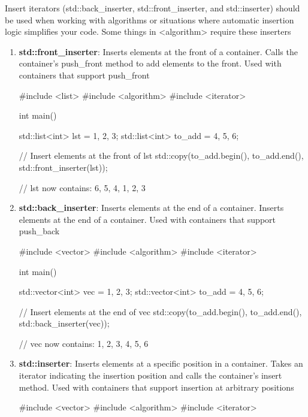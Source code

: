 \documentclass{report}
\begin{document}
\begin{itemize}
            Insert iterators (std::back\_inserter, std::front\_inserter, and std::inserter) should be used when working with algorithms or situations where automatic insertion logic simplifies your code.
            \bigbreak \noindent 
            Some things in <algorithm> require these inserters
            \begin{enumerate}
                \item \textbf{std::front\_inserter}: Inserts elements at the front of a container. Calls the container's push\_front method to add elements to the front. Used with containers that support push\_front 
                    \bigbreak \noindent 
                    \begin{cppcode}
                        #include <list>
                        #include <algorithm>
                        #include <iterator>

                        int main() {
                            std::list<int> lst = {1, 2, 3};
                            std::list<int> to_add = {4, 5, 6};

                            // Insert elements at the front of lst
                            std::copy(to_add.begin(), to_add.end(), std::front_inserter(lst));

                            // lst now contains: 6, 5, 4, 1, 2, 3
                        }
                    \end{cppcode}
                \item \textbf{std::back\_inserter}: Inserts elements at the end of a container. Inserts elements at the end of a container. Used with containers that support push\_back 
                    \bigbreak \noindent 
                    \begin{cppcode}
                        #include <vector>
                        #include <algorithm>
                        #include <iterator>

                        int main() {
                            std::vector<int> vec = {1, 2, 3};
                            std::vector<int> to_add = {4, 5, 6};

                            // Insert elements at the end of vec
                            std::copy(to_add.begin(), to_add.end(), std::back_inserter(vec));

                            // vec now contains: 1, 2, 3, 4, 5, 6
                        }
                    \end{cppcode}
                \item \textbf{std::inserter}: Inserts elements at a specific position in a container.  Takes an iterator indicating the insertion position and calls the container's insert method. Used with containers that support insertion at arbitrary positions
                    \bigbreak \noindent 
                    \begin{cppcode}
                        #include <vector>
                        #include <algorithm>
                        #include <iterator>


\end{cppcode}
\end{enumerate}
\end{itemize}
\end{document}
